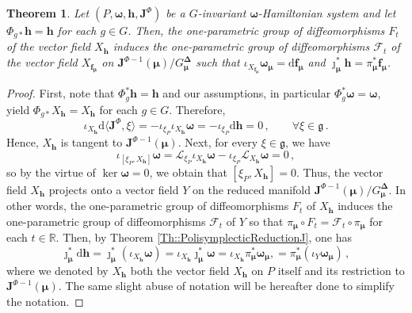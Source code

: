 \documentclass[11pt]{article}
\theoremstyle{plain}
\newtheorem{theorem}{Theorem}[section]
\theoremstyle{definition}
\newcommand{\bomega}{{\boldsymbol{\omega}}}
\renewcommand{\d}{\mathrm{d}}
\newcommand*{\inn}[1]{\iota_{#1}}
\newcommand{\Lie}{\mathscr{L}}
\def\d{\mathrm{d}}
\numberwithin{equation}{section}
\begin{document}
\begin{theorem}
\label{Th::Xreduction}
    Let $(P,\bomega,\bm h,\mathbf{J}^\Phi)$ be a $G$-invariant $\bomega$-Hamiltonian system and let $\Phi_{g*}{\bm h}={\bm h}$ for each $g\in G$. Then, the one-parametric group of diffeomorphisms $F_t$ of the vector field $X_{\bm h}$ induces the one-parametric group of diffeomorphisms $\mathcal{F}_t$ of the vector field $X_{\boldsymbol{f}_{\boldsymbol{\mu}}}$ on $\mathbf{J}^{\Phi-1}(\boldsymbol{\mu})/G^{\boldsymbol{\Delta}}_{\boldsymbol{\mu}}$ such that $\iota_{X_{\boldsymbol{f}_{\boldsymbol{\mu}}}}\boldsymbol{\omega}_{\boldsymbol{\mu}}=\d\boldsymbol{f}_{\boldsymbol{\mu}}$ and $\jmath_{\boldsymbol{\mu}}^*\boldsymbol{h}=\pi_{\boldsymbol{\mu}}^*\boldsymbol{f}_{\boldsymbol{\mu}}$.
\end{theorem}
\begin{proof}
   First, note that $\Phi_g^*\boldsymbol{h}=\boldsymbol{h}$ and our assumptions, in particular $\Phi_g^*\boldsymbol{\omega}=\boldsymbol{\omega}$,  yield $\Phi_{g*}X_{\boldsymbol{h}}=X_{\boldsymbol{h}}$ for each $g\in G$. Therefore,
   \[
   \inn{X_{\bm h}}\d \langle \mathbf{J}^\Phi,\xi\rangle=-\iota_{\xi_P}\iota_{X_{\bm h}}\boldsymbol{\omega}=-\iota_{\xi_P}\d\boldsymbol{h}=0\,,\qquad \forall \xi\in \mathfrak{g}\,.
   \]
    Hence, $X_{\bm h}$ is tangent to $\mathbf{J}^{\Phi-1}(\boldsymbol{\mu})$.
    Next, for every $\xi\in\mathfrak{g}$, we have
    \[\inn{[\xi_P,X_{\bm h}]}\boldsymbol{\omega}=\Lie_{\xi_P}\inn{X_{\bm h}}\boldsymbol{\omega}-\inn{\xi_P}\Lie_{X_{\bm h}}\boldsymbol{\omega}=0\,,
    \]
    so by the virtue of $\ker\boldsymbol{\omega}=0$, we obtain that $[\xi_P,X_{\bm h}]=0$. Thus, the vector field $X_{\bm h}$ projects onto a vector field $Y$ on the reduced manifold $\mathbf{J}^{\Phi-1}(\boldsymbol{\mu})/G^{\boldsymbol{\Delta}}_{\boldsymbol{\mu}}$. In other words, the one-parametric group of diffeomorphisms  $F_t$ of $X_{\bm h}$ induces the one-parametric group of diffeomorphisms $\mathcal{F}_t$ of $Y$ so that $\pi_{\boldsymbol{\mu}}\circ F_t = \mathcal{F}_t\circ \pi_{\boldsymbol{\mu}}$ for each $t\in \mathbb{R}$. Then, by Theorem \ref{Th::PolisymplecticReductionJ}, one has
    \begin{equation}
    \label{Eq::Xfreduction}
    \jmath_{\boldsymbol{\mu}}^*\d\boldsymbol{h} = \jmath^*_{\boldsymbol{\mu}}(\inn{X_{\bm h}}\boldsymbol{\omega}) = \inn{X_{\bm h}}\jmath^*_{\boldsymbol{\mu}}\boldsymbol{\omega} = \inn{X_{\bm h}}\pi^*_{\boldsymbol{\mu}}\boldsymbol{\omega}_{\boldsymbol{\mu}}, = \pi^*_{\boldsymbol{\mu}}(\inn{Y}\boldsymbol{\omega}_{\boldsymbol{\mu}})\,,
    \end{equation}
    where we denoted by $X_{\bm h}$ both the vector field $X_{\bm h}$ on $P$ itself and its restriction to $\mathbf{J}^{\Phi-1}(\boldsymbol{\mu})$. The same slight abuse of notation will be hereafter done to simplify the notation. 
    

\end{proof}
\end{document}
